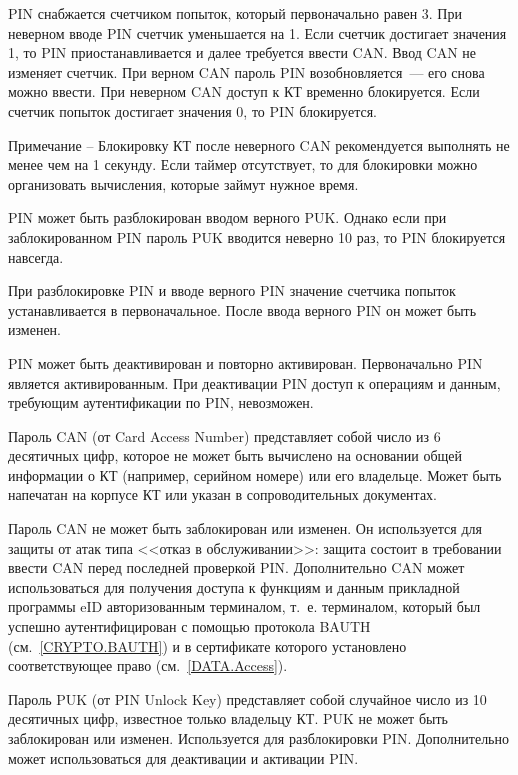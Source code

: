 

PIN снабжается счетчиком попыток, который первоначально равен 3. При 
неверном вводе PIN счетчик уменьшается на 1. Если счетчик достигает 
значения 1, то PIN приостанавливается и далее требуется ввести CAN. 
Ввод CAN не изменяет счетчик. При верном CAN пароль PIN возобновляется~--- 
его снова можно ввести. При неверном CAN доступ к КТ временно блокируется. 
Если счетчик попыток достигает значения 0, то PIN блокируется. 

\begin{note}
Примечание -- Блокировку КТ после неверного CAN рекомендуется выполнять не 
менее чем на 1 секунду. Если таймер отсутствует, то для блокировки можно 
организовать вычисления, которые займут нужное время. 
\end{note}
\fi

PIN может быть разблокирован вводом верного PUK. Однако если при 
заблокированном PIN пароль PUK вводится неверно 10 раз, то PIN блокируется 
навсегда.

При разблокировке PIN и вводе верного PIN значение счетчика попыток 
устанавливается в первоначальное. После ввода верного PIN он  
может быть изменен. 

PIN может быть деактивирован и повторно активирован.
Первоначально PIN является активированным. При деактивации
PIN доступ к операциям и данным, требующим аутентификации по PIN, невозможен.

Пароль CAN (от Card Access Number) представляет собой число из 6 десятичных 
цифр, которое не может быть вычислено на основании общей информации о КТ 
(например, серийном номере) или его владельце. Может быть напечатан на корпусе 
КТ или указан в сопроводительных документах. 

Пароль CAN не может быть заблокирован или изменен. Он используется для защиты 
от атак типа <<отказ в обслуживании>>: защита состоит в требовании ввести CAN перед 
последней проверкой PIN. Дополнительно CAN может использоваться для 
получения доступа к функциям и данным прикладной программы eID 
авторизованным терминалом, т.~е. терминалом, который был успешно 
аутентифицирован с помощью протокола BAUTH (см.~\ref{CRYPTO.BAUTH}) и в 
сертификате которого установлено соответствующее право (см.~\ref{DATA.Access}). 

Пароль PUK (от PIN Unlock Key) представляет собой случайное число из 10 
десятичных цифр, известное только владельцу КТ. PUK не может быть заблокирован 
или изменен. Используется для разблокировки PIN. Дополнительно может использоваться 
для деактивации и активации PIN.

